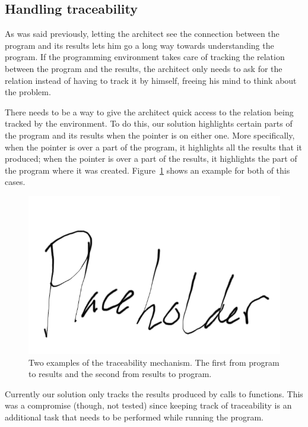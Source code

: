 \subsection{Handling traceability}
As was said previously, letting the architect see the connection between the program and its results lets him go a long way towards understanding the program.
If the programming environment takes care of tracking the relation between the program and the results, the architect only needs to ask for the relation instead of having to track it by himself, freeing his mind to think about the problem.

There needs to be a way to give the architect quick access to the relation being tracked by the environment.
To do this, our solution highlights certain parts of the program and  its results when the pointer is on either one.
More specifically, when the pointer is over a part of the program, it highlights all the results that it produced;
when the pointer is over a part of the results, it highlights the part of the program where it was created.
Figure~\ref{fig:trace:example} shows an example for both of this cases.

\begin{figure}
  \centering
  \includegraphics[width=12cm]{./images/traceability_example}
  \caption{Two examples of the traceability mechanism. The first from program to results and the second from results to program.}
  \label{fig:trace:example}
\end{figure}

Currently our solution only tracks the results produced by calls to functions.
This was a compromise (though, not tested) since keeping track of traceability is an additional task that needs to be performed while running the program.

